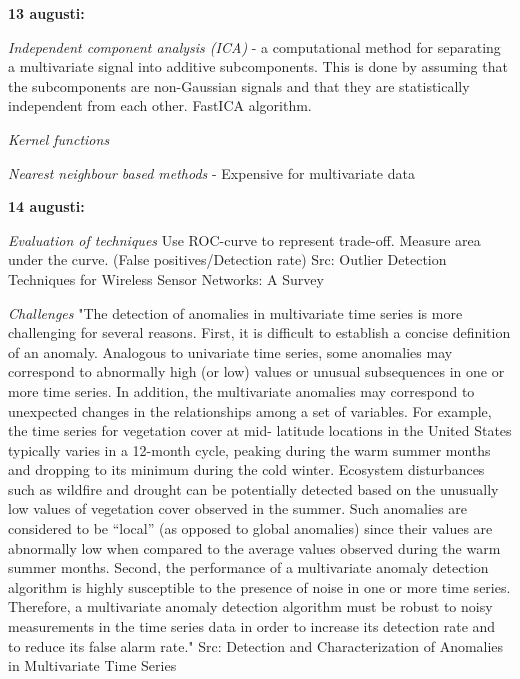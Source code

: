 \textbf{13 augusti:}

\textit{Independent component analysis (ICA)} -  a computational method for separating a multivariate signal into additive subcomponents. This is done by assuming that the subcomponents are non-Gaussian signals and that they are statistically independent from each other. FastICA algorithm.

\textit{Kernel functions}

\textit{Nearest neighbour based methods} - Expensive for multivariate data

\textbf{14 augusti:}

\textit{Evaluation of techniques}
Use ROC-curve to represent trade-off. Measure area under the curve. (False positives/Detection rate) 
Src: Outlier Detection Techniques for Wireless Sensor Networks: A Survey

\textit{Challenges}
"The detection of anomalies in multivariate time series
is more challenging for several reasons. First, it is difficult to establish a concise definition of an anomaly. Analogous to univariate time series, some anomalies may correspond to abnormally high (or low) values or unusual subsequences in one or more time series. In addition, the multivariate anomalies may correspond to unexpected changes in the relationships among a set of variables. For example, the time series for vegetation cover at mid- latitude locations in the United States typically varies in a 12-month cycle, peaking during the warm summer months and dropping to its minimum during the cold winter. Ecosystem disturbances such as wildfire and drought can be potentially detected based on the unusually low values of vegetation cover observed in the summer. Such anomalies are considered to be “local” (as opposed to global anomalies) since their values are abnormally low when compared to the average values observed during the warm summer months. Second, the performance of a multivariate anomaly detection algorithm is highly susceptible to the presence of noise in one or more time series. Therefore, a multivariate anomaly detection algorithm must be robust to noisy measurements in the time series data in order to increase its detection rate and to reduce its false alarm rate." 
Src: Detection and Characterization of Anomalies in Multivariate Time Series

